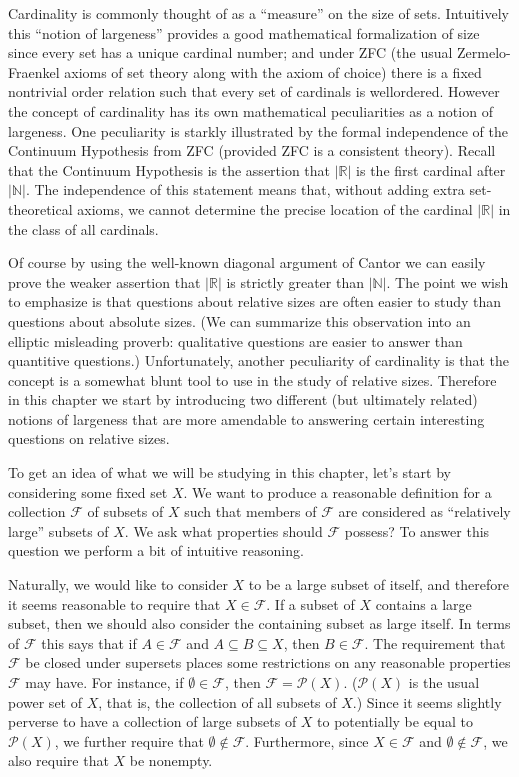 \documentclass[12pt]{article}
\theoremstyle{plain}
\theoremstyle{definition}
\newcommand{\bbN}{\mathbb{N}}
\newcommand{\bbR}{\mathbb{R}}
\newcommand{\calF}{\mathcal{F}}
\newcommand{\calP}{\mathcal{P}}
\begin{document}
Cardinality is commonly thought of as a ``measure'' on the size of sets.
Intuitively this ``notion of largeness'' provides a good mathematical formalization of size since every set has a unique cardinal number; and under ZFC (the usual Zermelo-Fraenkel axioms of set theory along with the axiom of choice) there is a fixed nontrivial order relation such that every set of cardinals is wellordered.
However the concept of cardinality has its own mathematical peculiarities as a notion of largeness.
One peculiarity is starkly illustrated by the formal independence of the Continuum Hypothesis from ZFC (provided ZFC is a consistent theory).
Recall that the Continuum Hypothesis is the assertion that $|\bbR|$ is the first cardinal after $|\bbN|$.
The independence of this statement means that, without adding extra set-theoretical axioms, we cannot determine the precise location of the cardinal $|\bbR|$ in the class of all cardinals.

Of course by using the well-known diagonal argument of Cantor%
we can easily prove the weaker assertion that $|\bbR|$ is strictly greater than $|\bbN|$.
The point we wish to emphasize is that questions about relative sizes are often easier to study than questions about absolute sizes.
(We can summarize this observation into an elliptic misleading proverb: qualitative questions are easier to answer than quantitive questions.)
Unfortunately, another peculiarity of cardinality is that the concept is a somewhat blunt tool to use in the study of relative sizes.
Therefore in this chapter we start by introducing two different (but ultimately related) notions of largeness that are more amendable to answering certain interesting questions on relative sizes.

To get an idea of what we will be studying in this chapter, let's start by considering some fixed set $X$.
We want to produce a reasonable definition for a collection $\calF$ of subsets of $X$ such that members of $\calF$ are considered as ``relatively large'' subsets of $X$.
We ask what properties should $\calF$ possess?
To answer this question we perform a bit of intuitive reasoning.

Naturally, we would like to consider $X$ to be a large subset of itself, and therefore it seems reasonable to require that $X \in \calF$.
If a subset of $X$ contains a large subset, then we should also consider the containing subset as large itself.
In terms of $\calF$ this says that if $A \in \calF$ and $A \subseteq B \subseteq X$, then $B \in \calF$. 
The requirement that $\calF$ be closed under supersets places some restrictions on any reasonable properties $\calF$ may have.
For instance, if $\emptyset \in \calF$, then $\calF = \calP(X)$. 
($\calP(X)$ is the usual power set of $X$, that is, the collection of all subsets of $X$.)
Since it seems slightly perverse to have a collection of large subsets of $X$ to potentially be equal to $\calP(X)$, we further require that $\emptyset \not\in \calF$. 
Furthermore, since $X \in \calF$ and $\emptyset \not\in \calF$, we also require that $X$ be nonempty.
\end{document}
